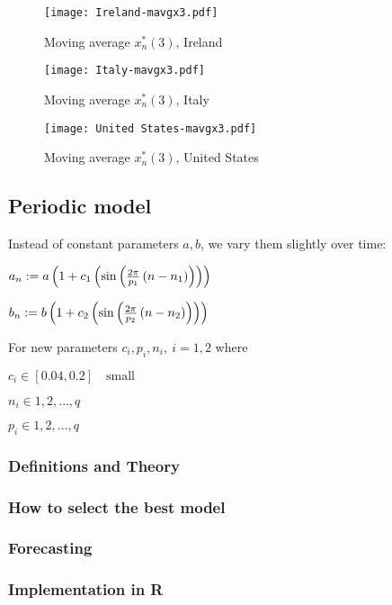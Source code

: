 \begin{figure}[H]
\texttt{[image: Ireland-mavgx3.pdf]}
\endminipage 
\caption{Moving average $x^*_n (3)$, Ireland}
\end{figure}

\begin{figure}[H]
\texttt{[image: Italy-mavgx3.pdf]}
\endminipage 
\caption{Moving average $x^*_n (3)$, Italy}
\end{figure}

\begin{figure}[H]
\texttt{[image: United States-mavgx3.pdf]}
\endminipage 
\caption{Moving average $x^*_n (3)$, United States}
\end{figure}

\subsection{Periodic model}

Instead of constant parameters $a,b$, we vary them slightly over time:

$a_n := a\left(1+c_1\left(\sin\left(\frac{2\pi}{p_1}\left(n-n_1\right)\right)\right)\right)$

$b_n := b\left(1+c_2\left(\sin\left(\frac{2\pi}{p_2}\left(n-n_2\right)\right)\right)\right)$

For new parameters $c_i,p_i,n_i, \ i=1,2$ where

$c_i  \in [0.04, 0.2] \quad \text{small}$

$n_i  \in 1,2,\dots,q$

$p_i  \in 1,2,\dots,q$

\subsubsection{Definitions and Theory}

\subsubsection{How to select the best model}

\subsubsection{Forecasting}

\subsubsection{Implementation in R}

